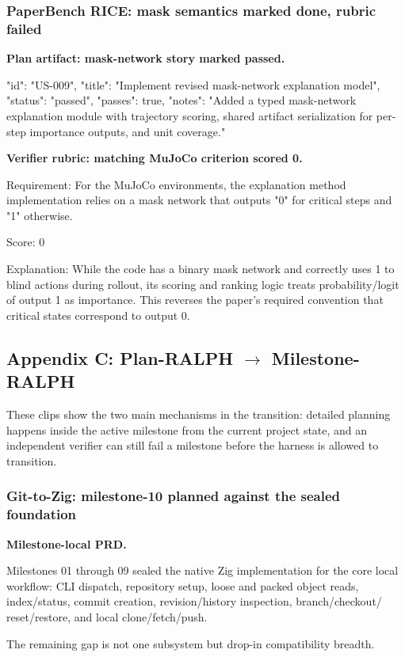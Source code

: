 \documentclass[11pt,a4paper]{article}
\begin{document}
\subsubsection{PaperBench RICE: mask semantics marked done, rubric failed}

\textbf{Plan artifact: mask-network story marked passed.}

\begin{cbox}
{
  "id": "US-009",
  "title": "Implement revised mask-network explanation model",
  "status": "passed",
  "passes": true,
  "notes": "Added a typed mask-network explanation module with trajectory scoring, shared artifact serialization for per-step importance outputs, and unit coverage."
}
\end{cbox}

\textbf{Verifier rubric: matching MuJoCo criterion scored 0.}

\begin{cbox}
Requirement:
For the MuJoCo environments, the explanation method implementation relies on
a mask network that outputs "0" for critical steps and "1" otherwise.

Score: 0

Explanation:
While the code has a binary mask network and correctly uses 1 to blind actions
during rollout, its scoring and ranking logic treats probability/logit of
output 1 as importance. This reverses the paper's required convention that
critical states correspond to output 0.
\end{cbox}

\subsection{Appendix C: Plan-RALPH $\rightarrow$ Milestone-RALPH}

These clips show the two main mechanisms in the transition: detailed planning happens inside the active milestone from the current project state, and an independent verifier can still fail a milestone before the harness is allowed to transition.

\subsubsection{Git-to-Zig: milestone-10 planned against the sealed foundation}

\textbf{Milestone-local PRD.}

\begin{cbox}
Milestones 01 through 09 sealed the native Zig implementation for the core
local workflow: CLI dispatch, repository setup, loose and packed object reads,
index/status, commit creation, revision/history inspection, branch/checkout/
reset/restore, and local clone/fetch/push.

The remaining gap is not one subsystem but drop-in compatibility breadth.
\end{cbox}
\end{document}
